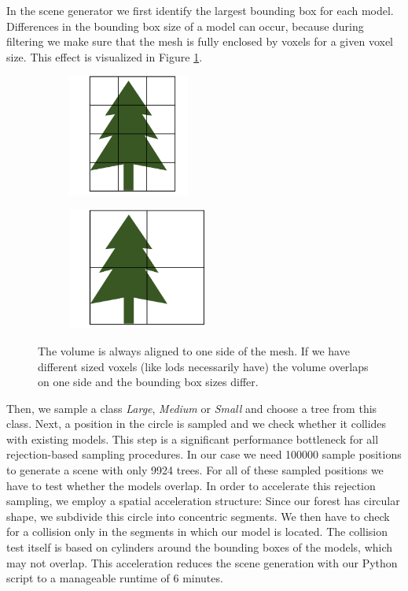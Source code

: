 In the scene generator we first identify the largest bounding box for each model.
Differences in the bounding box size of a model can occur, because during filtering we make sure that the mesh is fully enclosed by voxels for a given voxel size.
This effect is visualized in Figure \ref{fig:bounding_sizes}.
\begin{figure}[t]
    \centering
    \begin{subfigure}[b]{0.45\linewidth}
        \centering
        \includegraphics[height=4cm]{img/bounding_size_1.png}
    \end{subfigure}
    \begin{subfigure}[b]{0.45\linewidth}
        \centering
        \includegraphics[height=4cm]{img/bounding_size_2.png}
    \end{subfigure}
	\caption[Bounding boxes resulting from different sized voxels]{The volume is always aligned to one side of the mesh. If we have different sized voxels (like \acsp{lod} necessarily have) the volume overlaps on one side and the bounding box sizes differ.}
	\label{fig:bounding_sizes}
\end{figure}
Then, we sample a class \textit{Large}, \textit{Medium} or \textit{Small} and choose a tree from this class.
Next, a position in the circle is sampled and we check whether it collides with existing models.
This step is a significant performance bottleneck for all rejection-based sampling procedures.
In our case we need 100000 sample positions to generate a scene with only 9924 trees.
For all of these sampled positions we have to test whether the models overlap.
In order to accelerate this rejection sampling, we employ a spatial acceleration structure: Since our forest has circular shape, we subdivide this circle into concentric segments.
We then have to check for a collision only in the segments in which our model is located.
The collision test itself is based on cylinders around the bounding boxes of the models, which may not overlap.
This acceleration reduces the scene generation with our Python script to a manageable runtime of 6 minutes.

